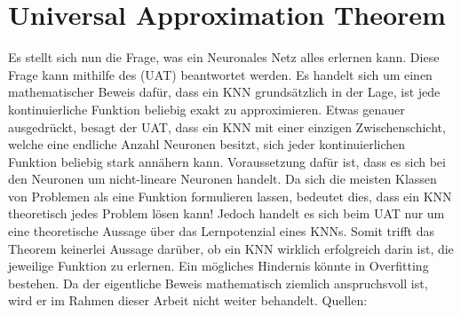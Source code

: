 \section{Universal Approximation Theorem}\label{sec:UAT}
Es stellt sich nun die Frage, was ein Neuronales Netz alles erlernen kann.
Diese Frage kann mithilfe des  (UAT)
beantwortet werden. Es handelt sich um einen mathematischer Beweis dafür, dass ein KNN
grundsätzlich in der Lage, ist jede kontinuierliche Funktion beliebig exakt zu
approximieren.
\para{}
Etwas genauer ausgedrückt, besagt der UAT, dass ein KNN mit einer einzigen
Zwischenschicht, welche eine endliche Anzahl Neuronen besitzt, sich jeder kontinuierlichen
Funktion beliebig stark annähern kann. Voraussetzung dafür ist, dass es sich bei den
Neuronen um nicht-lineare Neuronen handelt.
Da sich die meisten Klassen von Problemen als eine Funktion formulieren
lassen, bedeutet dies, dass ein KNN theoretisch jedes Problem lösen kann!
Jedoch handelt es sich beim UAT nur um eine theoretische
Aussage über das Lernpotenzial eines KNNs. Somit trifft das Theorem keinerlei Aussage
darüber, ob ein KNN wirklich erfolgreich darin ist, die jeweilige Funktion zu erlernen.
Ein mögliches Hindernis könnte in Overfitting bestehen.
\para{}
Da der eigentliche Beweis mathematisch ziemlich anspruchsvoll ist, wird er im
Rahmen dieser Arbeit nicht weiter behandelt.
\para{}
Quellen: \cite{Nielsen} \cite{wiki:uat}


\pagebreak

